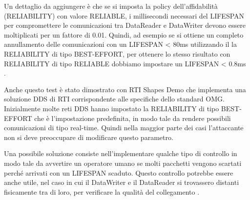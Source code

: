 Un dettaglio da aggiungere è che se si imposta la policy
dell'affidabilità (RELIABILITY) con valore RELIABLE, i millisecondi necessari
del LIFESPAN per compromettere le comunicazioni tra DataReader e DataWriter
devono essere moltiplicati per un fattore di 0.01. Quindi, ad esempio se si
ottiene un completo annullamento delle comunicazioni con un LIFESPAN < 80ms
utilizzando il la RELIABILITY di tipo BEST-EFFORT, per ottenere lo stesso
risultato con RELIABILITY di tipo RELIABLE dobbiamo impostare un
LIFESPAN < 0.8ms
\cite{DBLP:conf/malware/MichaudDL18}.

Anche questo test è stato dimostrato con RTI Shapes Demo che 
implementa una
soluzione DDS di RTI corrispondente alle specifiche dello standard OMG.
Inizialmente molte reti DDS hanno impostato la RELIABILITY
di tipo BEST-EFFORT che è l'impostazione predefinita,
in modo tale da rendere possibili comunicazioni di tipo real-time.
Quindi nella maggior parte
dei casi l'attaccante non si deve preoccupare di modificare questo parametro.

Una possibile soluzione consiste nell'implementare qualche tipo di controllo
in modo tale da avvertire un operatore umano se molti pacchetti vengono
scartati perché arrivati con un LIFESPAN scaduto. Questo controllo potrebbe
essere anche utile, nel caso in cui il DataWriter e il DataReader si trovassero
distanti fisicamente tra di loro, per verificare la qualità del collegamento
\cite{DBLP:conf/malware/MichaudDL18}.


